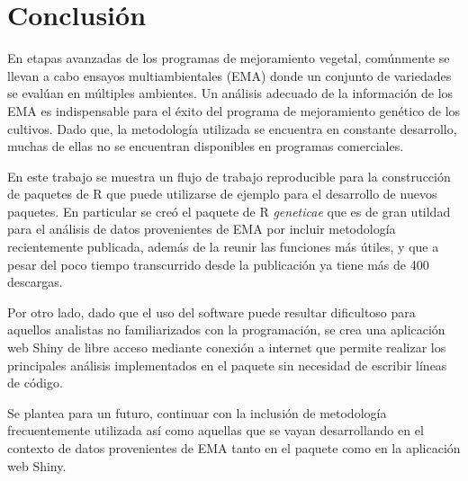 \chapter{Conclusión}

En etapas avanzadas de los programas de mejoramiento vegetal, comúnmente se llevan a cabo ensayos multiambientales (EMA) donde un conjunto de variedades se evalúan en múltiples ambientes. Un análisis adecuado de la información de los EMA es indispensable para el éxito del programa de mejoramiento genético de los cultivos. Dado que, la metodología utilizada se encuentra en constante desarrollo, muchas de ellas no se encuentran disponibles en programas comerciales. 

En este trabajo se muestra un flujo de trabajo reproducible para la construcción de paquetes de R que puede utilizarse de ejemplo para el desarrollo de nuevos paquetes. En particular se creó el paquete de R \emph{geneticae} que es de gran utildad para el análisis de datos provenientes de EMA por incluir metodología recientemente publicada, además de la reunir las funciones más útiles, y que a pesar del poco tiempo transcurrido desde la publicación ya tiene más de 400 descargas.


Por otro lado, dado que el uso del software puede resultar dificultoso para aquellos analistas no familiarizados con la programación, se crea una aplicación web Shiny de libre acceso mediante conexión a internet que permite realizar los principales análisis implementados en el paquete sin necesidad de escribir líneas de código.

Se plantea para un futuro, continuar con la inclusión de metodología frecuentemente utilizada así como aquellas que se vayan desarrollando en el contexto de datos provenientes de EMA tanto en el paquete como en la aplicación web Shiny. 




